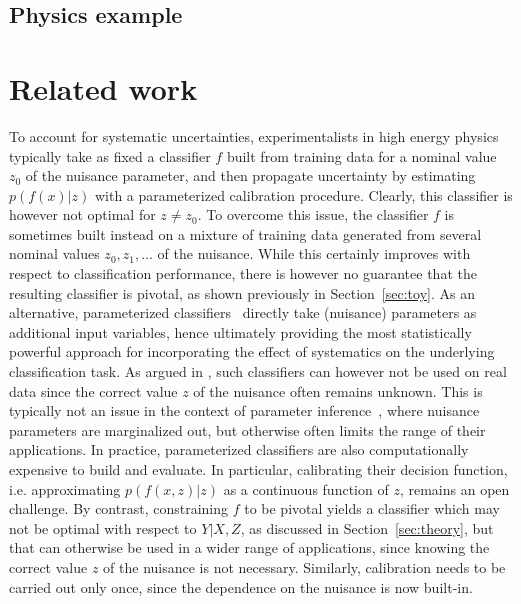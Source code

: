 \documentclass[twocolumn,superscriptaddress,aps]{revtex4-1}
\theoremstyle{plain}
\begin{document}
\subsection{Physics example}



\section{Related work}

To account for systematic uncertainties, experimentalists in high energy physics
typically take as fixed a classifier $f$ built from training data for a nominal
value $z_0$ of the nuisance parameter, and then propagate uncertainty
 by estimating $p(f(x)|z)$ with a parameterized calibration
procedure. Clearly, this classifier is however not optimal for $z \neq z_0$.
To overcome this issue, the classifier $f$ is sometimes built instead on a mixture
of training data generated from several nominal values $z_0, z_1, \dots$ of the nuisance.
While this certainly improves with respect to classification performance,
there is however no guarantee that the resulting classifier is pivotal, as shown
previously in Section~\ref{sec:toy}.
As an alternative, parameterized
classifiers~\citep{cranmer2015approximating,Baldi:2016fzo} directly take
(nuisance) parameters as additional input variables, hence ultimately providing
the most statistically powerful approach for incorporating the effect of
systematics on the underlying classification task.  As argued in
\citep{Neal:2007zz}, such classifiers can however not be used on real data since
the correct value $z$ of the nuisance often remains unknown. This is typically
not an issue in the context of parameter
inference~\citep{cranmer2015approximating}, where nuisance parameters are
marginalized out, but otherwise often limits the range of their applications. In
practice, parameterized classifiers  are also computationally expensive to build
and evaluate. In particular, calibrating their decision function, i.e.
approximating $p(f(x,z)|z)$ as a continuous function of $z$, remains an open
challenge. By contrast, constraining $f$ to be pivotal yields a classifier which
may not be optimal with respect to $Y|X,Z$, as discussed in
Section~\ref{sec:theory}, but that can otherwise be used in a wider range of
applications, since knowing the correct value $z$ of the nuisance is not
necessary. Similarly, calibration needs to be carried out only once, since  the
dependence on the nuisance is now built-in.
\end{document}
